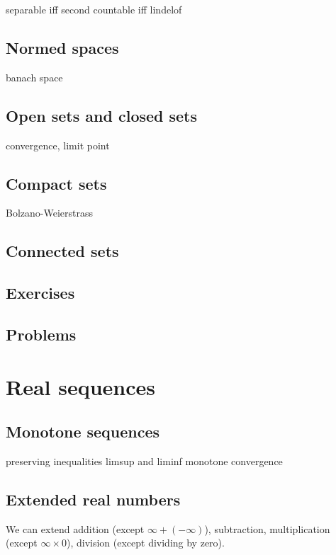 \documentclass{../../large}
\begin{document}
\begin{prb}
separable iff second countable iff lindelof
\end{prb}

\section{Normed spaces}
banach space

\section{Open sets and closed sets}
convergence, limit point
\section{Compact sets}
Bolzano-Weierstrass
\section{Connected sets}



\section*{Exercises}
\section*{Problems}




\chapter{Real sequences}

\section{Monotone sequences}
preserving inequalities
limsup and liminf
monotone convergence


\section{Extended real numbers}
\begin{prb}
We can extend addition (except $\infty+(-\infty)$), subtraction, multiplication (except $\infty\times0$), division (except dividing by zero).
\end{prb}
\end{document}

